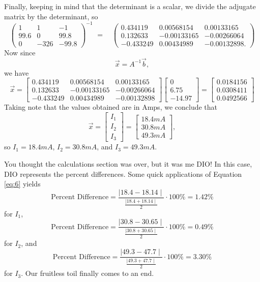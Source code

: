 \documentclass{article}
\begin{document}
Finally, keeping in mind that the determinant is a scalar, we divide the adjugate matrix by the determinant, so
\[
\begin{pmatrix}
    1 & 1 & -1 \\
    99.6 & 0 & 99.8\\
    0 & -326 & -99.8
\end{pmatrix}^{-1} \, \,  = \quad
\begin{pmatrix}
    0.434119 & 0.00568154 & 0.00133165 \\
    0.132633 & -0.00133165 & -0.00266064\\
    -0.433249 & 0.00434989 & -0.00132898.
\end{pmatrix}
\]
\newline
Now since
\begin{equation*}
    \vec{x} = A^{-1} \vec{b},
\end{equation*}
we have
\newline
\[
\vec{x} =
\begin{bmatrix}
    0.434119 & 0.00568154 & 0.00133165 \\
    0.132633 & -0.00133165 & -0.00266064\\
    -0.433249 & 0.00434989 & -0.00132898
\end{bmatrix}
\begin{bmatrix}
    0\\
    6.75\\
    -14.97
\end{bmatrix} = 
\begin{bmatrix}
    0.0184156\\
    0.0308411\\
    0.0492566
\end{bmatrix}
\]
Taking note that the values obtained are in Amps, we conclude that
\[
\vec{x} =
\begin{bmatrix}
    I_1\\
    I_2\\
    I_3
\end{bmatrix}
=
\begin{bmatrix}
    18.4 mA\\
    30.8 mA\\
    49.3 mA
\end{bmatrix},
\]
so $I_1 = 18.4 mA$, $I_2 = 30.8 mA$, and $I_3 = 49.3 mA$.

You thought the calculations section was over, but it was me DIO! In this case, DIO represents the percent differences. Some quick applications of Equation 
\ref{eq:6} yields
\begin{equation*}
    \text{Percent Difference} = \frac{\mid \! 18.4-18.14  \mid}{\frac{\mid 18.4+18.14 \mid}{2}} \cdot 100\% = 1.42\%
\end{equation*}
for $I_1$,
\begin{equation*}
    \text{Percent Difference} = \frac{\mid \! 30.8-30.65  \mid}{\frac{\mid 30.8+30.65 \mid}{2}} \cdot 100\% = 0.49\%
\end{equation*}
for $I_2$, and 
\begin{equation*}
    \text{Percent Difference} = \frac{\mid \! 49.3-47.7  \mid}{\frac{\mid 49.3+47.7 \mid}{2}} \cdot 100\% = 3.30\%
\end{equation*}
for $I_3$. Our fruitless toil finally comes to an end.
\end{document}
